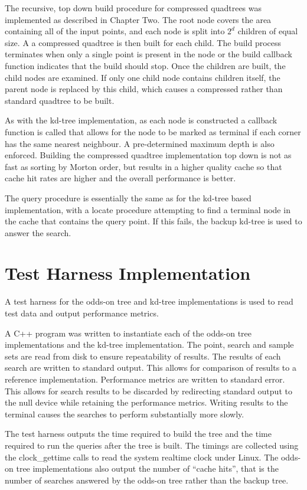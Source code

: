\documentclass[mcs]{scsthesis}
\begin{document}
The recursive, top down build procedure for compressed quadtrees was implemented
as described in Chapter Two. The root node covers the area containing all of the
input points, and each node is split into \(2^d\) children of equal size. A 
a compressed quadtree is then built for each child. The build process terminates
when only a single point is present in the node or the build callback function
indicates that the build should stop. Once the children are built, the child
nodes are examined. If only one child node contains children itself, the parent
node is replaced by this child, which causes a compressed rather than standard
quadtree to be built.

As with the kd-tree implementation, as each node is constructed a callback
function is called that allows for the node to be marked as terminal if each
corner has the same nearest neighbour. A pre-determined maximum depth is also
enforced. Building the compressed quadtree implementation top down is not as
fast as sorting by Morton order, but results in a higher quality cache so that
cache hit rates are higher and the overall performance is better. 

The query procedure is essentially the same as for the kd-tree based
implementation, with a locate procedure attempting to find a terminal node in
the cache that contains the query point. If this fails, the backup kd-tree is
used to answer the search.

\section{Test Harness Implementation}

A test harness for the odds-on tree and kd-tree implementations is used to
read test data and output performance metrics.

A C++ program was written to instantiate each of the odds-on tree implementations
and the kd-tree implementation. The point, search and sample sets are read from
disk to ensure repeatability of results. The results of each search are written
to standard output. This allows for comparison of results to a reference
implementation. Performance metrics are written to standard error. This allows
for search results to be discarded by redirecting standard output to the null
device while retaining the performance metrics. Writing results to the terminal
causes the searches to perform substantially more slowly.

The test harness outputs the time required to build the tree and the time
required to run the queries after the tree is built. The timings are collected
using the clock\_gettime calls to read the system realtime clock under Linux.
The odds-on tree implementations also output the number of ``cache hits'', that
is the number of searches answered by the odds-on tree rather than the backup
tree.
\end{document}
